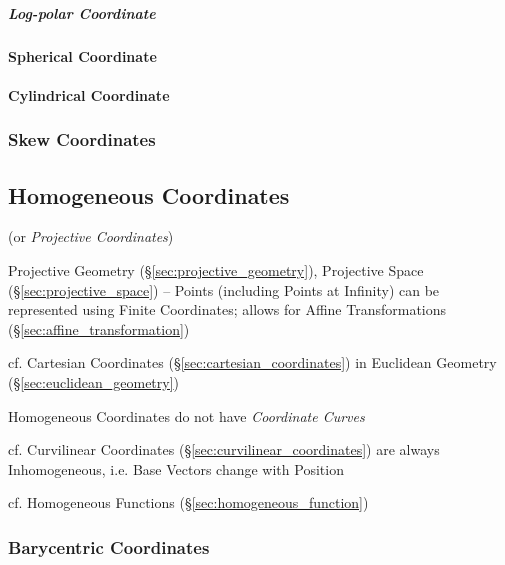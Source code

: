 \subparagraph{Log-polar Coordinate}\label{sec:logpolar_coordinates}\hfill



\paragraph{Spherical Coordinate}\label{sec:spherical_coordinates}\hfill

\paragraph{Cylindrical Coordinate}\label{sec:cylindrical_coordinates}\hfill



\subsubsection{Skew Coordinates}\label{sec:skew_coordinates}



\subsection{Homogeneous Coordinates}\label{sec:homogeneous_coordinates}

(or \emph{Projective Coordinates})

Projective Geometry (\S\ref{sec:projective_geometry}), Projective Space
(\S\ref{sec:projective_space}) -- Points (including Points at Infinity) can be
represented using Finite Coordinates; allows for Affine Transformations
(\S\ref{sec:affine_transformation})

\fist cf. Cartesian Coordinates (\S\ref{sec:cartesian_coordinates}) in Euclidean
Geometry (\S\ref{sec:euclidean_geometry})

Homogeneous Coordinates do not have \emph{Coordinate Curves}

cf. Curvilinear Coordinates (\S\ref{sec:curvilinear_coordinates}) are always
Inhomogeneous, i.e. Base Vectors change with Position

\fist cf. Homogeneous Functions (\S\ref{sec:homogeneous_function})



\subsubsection{Barycentric Coordinates}\label{sec:barycentric_coordinates}

